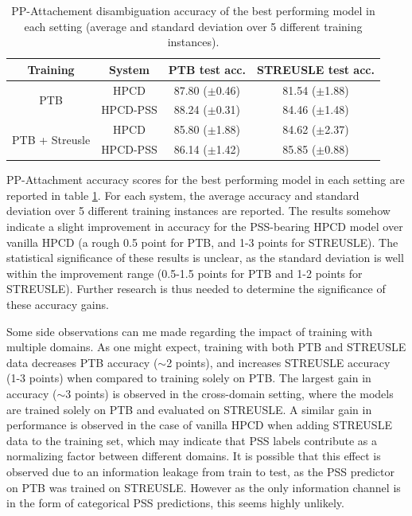 \begin{table}[]
    \setlength{\tabcolsep}{10pt} %
    \renewcommand{\arraystretch}{1.5}
    \newcommand{\score}[2]{#1 {\footnotesize ($\pm$#2)}}
    \centering
    \begin{tabular}{c|c|c|c}
         Training                        & System   & PTB test acc. & STREUSLE test acc.\\ \hline
         \multirow{2}{*}{PTB}            & HPCD     & \score{87.80}{0.46} & \score{81.54}{1.88}         \\ 
                                         & HPCD-PSS & \score{88.24}{0.31} & \score{84.46}{1.48}         \\ \hline
         \multirow{2}{*}{PTB + Streusle} & HPCD     & \score{85.80}{1.88} & \score{84.62}{2.37}         \\ 
                                         & HPCD-PSS & \score{86.14}{1.42} & \score{85.85}{0.88}         \\ \hline
    \end{tabular}
    \caption{PP-Attachement disambiguation accuracy of the best performing model in each setting (average and standard deviation over 5 different training instances).}
    \label{tab:hpcdresults}
\end{table}

PP-Attachment accuracy scores for the best performing model in each setting are reported in table \ref{tab:hpcdresults}. For each system, the average accuracy and standard deviation over 5 different training instances are reported. The results somehow indicate a slight improvement in accuracy for the PSS-bearing HPCD model over vanilla HPCD (a rough 0.5 point for PTB, and 1-3 points for STREUSLE). The statistical significance of these results is unclear, as the standard deviation is well within the improvement range (0.5-1.5 points for PTB and 1-2 points for STREUSLE). Further research is thus needed to determine the significance of these accuracy gains. 

Some side observations can me made regarding the impact of training with multiple domains. As one might expect, training with both PTB and STREUSLE data decreases PTB accuracy ($\sim$2 points), and increases STREUSLE accuracy (1-3 points) when compared to training solely on PTB. The largest gain in accuracy ($\sim$3 points) is observed in the cross-domain setting, where the models are trained solely on PTB and evaluated on STREUSLE. A similar gain in performance is observed in the case of vanilla HPCD when adding STREUSLE data to the training set, which may indicate that PSS labels contribute as a normalizing factor between different domains. It is possible that this effect is observed due to an information leakage from train to test, as the PSS predictor on PTB was trained on STREUSLE. However as the only information channel is in the form of categorical PSS predictions, this seems highly unlikely.


